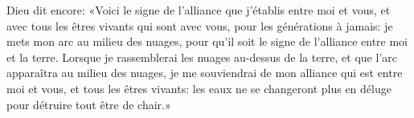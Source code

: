 Dieu dit encore:
	«Voici le signe de l’alliance que j’établis entre moi et vous,
	et avec tous les êtres vivants qui sont avec vous, pour les générations à jamais:
	je mets mon arc au milieu des nuages,
	pour qu’il soit le signe de l’alliance entre moi et la terre.
Lorsque je rassemblerai les nuages au-dessus de la terre,
	et que l’arc apparaîtra au milieu des nuages,
	je me souviendrai de mon alliance qui est entre moi et vous,
	et tous les êtres vivants:
	les eaux ne se changeront plus en déluge pour détruire tout être de chair.»
